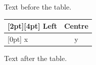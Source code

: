 \documentclass[12pt]{article}
\begin{document}
Text before the table.

\begin{tabular}{|l|c|}\hline\rowcolor{red!10}[2pt][4pt] Left & Centre\\\hline\rowcolor{green!10}[0pt] x & y\\\hline\end{tabular}

Text after the table.
\end{document}

